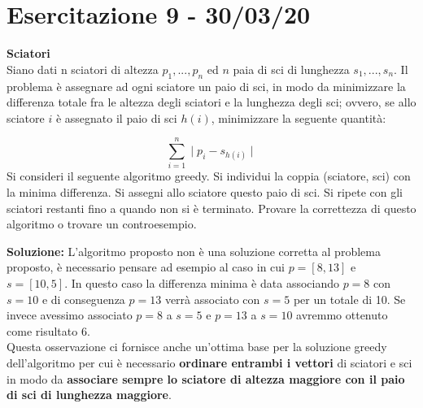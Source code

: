 \documentclass[../cheatSheetAlgoritmi.tex]{subfiles}
\begin{document}
\section{Esercitazione 9 - 30/03/20}
\textbf{Sciatori}\\
Siano dati n sciatori di altezza $p_{1}, ..., p_{n}$ ed $n$ paia di sci di lunghezza $s_{1}, ..., s_{n}$. Il problema è assegnare ad ogni sciatore un paio di sci, in modo da minimizzare la differenza totale fra le altezza degli sciatori e la lunghezza degli sci; ovvero, se allo sciatore $i$ è assegnato il paio di sci $h(i)$, minimizzare la seguente quantità:


\begin{equation}
	\sum_{i = 1}^{n}\mid{p_{i} - s_{h(i)}}\mid
\end{equation}
Si consideri il seguente algoritmo greedy. Si individui la coppia (sciatore, sci) con la minima differenza. Si assegni allo sciatore questo paio di sci. Si ripete con gli sciatori restanti fino a quando non si è terminato. Provare la correttezza di questo algoritmo o trovare un controesempio.

\bigskip
\textbf{Soluzione:} L'algoritmo proposto non è una soluzione corretta al problema proposto, è necessario pensare ad esempio al caso in cui $p = [8, 13]$ e $s = [10, 5]$. In questo caso la differenza minima è data associando $p = 8$ con $s = 10$ e di conseguenza $p = 13$ verrà associato con $s = 5$ per un totale di 10. Se invece avessimo associato $p = 8$ a $s = 5$ e $p = 13$ a $s = 10$ avremmo ottenuto come risultato 6.\\
Questa osservazione ci fornisce anche un'ottima base per la soluzione greedy dell'algoritmo per cui è necessario \textbf{ordinare entrambi i vettori} di sciatori e sci in modo da \textbf{associare sempre lo sciatore di altezza maggiore con il paio di sci di lunghezza maggiore}.
\end{document}

